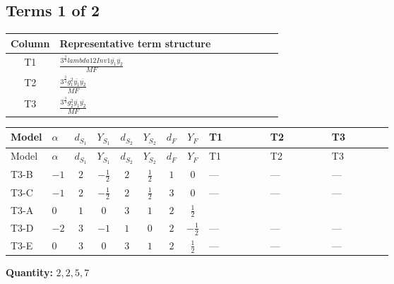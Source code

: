 \documentclass[8pt]{article}
\begin{document}
\begin{landscape}
\subsection*{Terms 1 of 2}
\begin{center}
\begin{tabular}{@{}c >{\raggedright\arraybackslash}p{0.82\linewidth}@{}}
\toprule
Column & Representative term structure \\
\midrule
T1 & \(\displaystyle \frac{3^{\frac{3}{4}} lambda12Inv1 \overline{y_{1}} \overline{y_{2}}}{MF}\) \\
\midrule
T2 & \(\displaystyle \frac{3^{\frac{3}{4}} g_{1}^{2} \overline{y_{1}} \overline{y_{2}}}{MF}\) \\
\midrule
T3 & \(\displaystyle \frac{3^{\frac{3}{4}} g_{2}^{2} \overline{y_{1}} \overline{y_{2}}}{MF}\) \\
\midrule
\bottomrule
\end{tabular}
\end{center}
\smallskip
\tiny
\begin{longtable}{@{}llcccccc >{\raggedright\arraybackslash}p{0.21\linewidth} >{\raggedright\arraybackslash}p{0.21\linewidth} >{\raggedright\arraybackslash}p{0.21\linewidth}@{}}
\toprule
Model & $\alpha$ & $d_{S_1}$ & $Y_{S_1}$ & $d_{S_2}$ & $Y_{S_2}$ & $d_F$ & $Y_F$ & T1 & T2 & T3 \\
\midrule
\endfirsthead
\toprule
Model & $\alpha$ & $d_{S_1}$ & $Y_{S_1}$ & $d_{S_2}$ & $Y_{S_2}$ & $d_F$ & $Y_F$ & T1 & T2 & T3 \\
\midrule
\endhead
T3-B & $-1$ & $2$ & $-\frac{1}{2}$ & $2$ & $\frac{1}{2}$ & $1$ & $0$ & --- & --- & --- \\
\midrule
T3-C & $-1$ & $2$ & $-\frac{1}{2}$ & $2$ & $\frac{1}{2}$ & $3$ & $0$ & --- & --- & --- \\
\midrule
T3-A & $0$ & $1$ & $0$ & $3$ & $1$ & $2$ & $\frac{1}{2}$ & \scriptsize\adjustbox{max width=\linewidth}{$\begin{gathered} \frac{3^{\frac{3}{4}} lambda12Inv1 \overline{y_{1}} \overline{y_{2}}}{6 MF}\end{gathered}$} & \scriptsize\adjustbox{max width=\linewidth}{$\begin{gathered} \frac{3^{\frac{3}{4}} g_{1}^{2} \overline{y_{1}} \overline{y_{2}}}{8 MF}\end{gathered}$} & \scriptsize\adjustbox{max width=\linewidth}{$\begin{gathered} \frac{17 \cdot 3^{\frac{3}{4}} g_{2}^{2} \overline{y_{1}} \overline{y_{2}}}{24 MF}\end{gathered}$} \\
\midrule
T3-D & $-2$ & $3$ & $-1$ & $1$ & $0$ & $2$ & $-\frac{1}{2}$ & --- & --- & --- \\
\midrule
T3-E & $0$ & $3$ & $0$ & $3$ & $1$ & $2$ & $\frac{1}{2}$ & --- & --- & --- \\
\midrule
\bottomrule
\end{longtable}
\clearpage
\noindent\textbf{Quantity: }$\mathrm{2,2,5,7}$\par\smallskip

\end{landscape}
\end{document}
